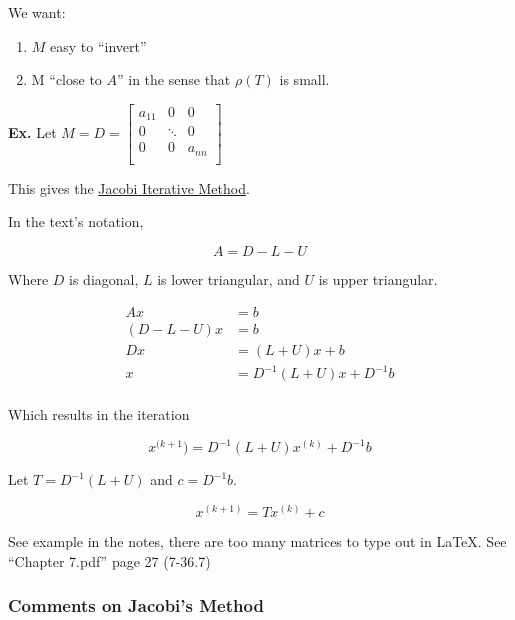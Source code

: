 \documentclass[12pt]{article}
\newcommand{\ex}{\textbf{Ex.}\xspace}
\begin{document}
We want:

\begin{enumerate}
\item $M$ easy to \enquote{invert}
\item M \enquote{close to $A$} in the sense that $\rho(T)$ is small.
\end{enumerate}

\ex Let $M=D=\begin{bmatrix}
  a_{11} & 0 & 0\\
0 & \ddots & 0\\
0 & 0 & a_{nn}\\
\end{bmatrix}$

This gives the \uline{Jacobi Iterative Method}.

In the text's notation,

\begin{equation*}
  A=D-L-U
\end{equation*}

Where $D$ is diagonal, $L$ is lower triangular, and $U$ is upper triangular.

\begin{align*}
  Ax &= b \\
  (D-L-U)x &= b \\
  Dx &= (L+U)x + b\\
  x &= D^{-1}(L+U)x +D^{-1}b \\
\end{align*}

Which results in the iteration 

\begin{equation*}
  x^{(k+1}) = D^{-1}(L+U)x^{(k)} + D^{-1}b
\end{equation*}

Let $T=D^{-1}(L+U)$ and $c=D^{-1}b$.

\begin{equation*}
  x^{(k+1)} = Tx^{(k)} + c
\end{equation*}

See example in the notes, there are too many matrices to type out in LaTeX.
See \enquote{Chapter 7.pdf} page 27 (7-36.7)


\subsubsection{Comments on Jacobi's Method}
\end{document}
